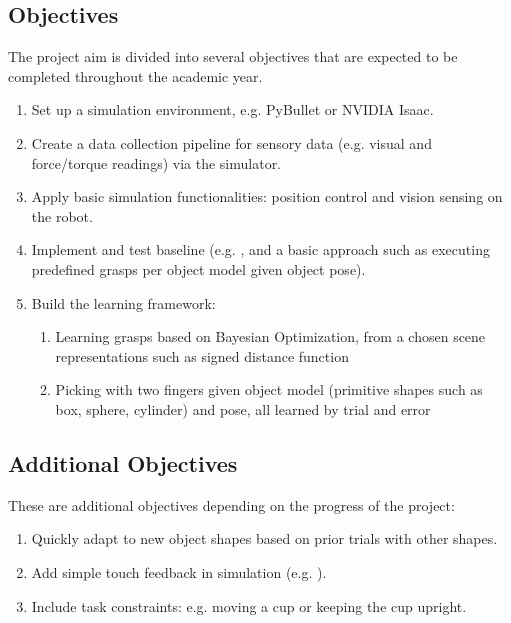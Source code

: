 \documentclass[12pt, a4paper]{report}
\theoremstyle{definition}
\begin{document}
\subsection{Objectives}
\label{sec:1.2.2}
The project aim is divided into several objectives that are expected to be completed throughout the academic year. 
\begin{enumerate}
    \item Set up a simulation environment, e.g. PyBullet or NVIDIA Isaac. 
    \item Create a data collection pipeline for sensory data (e.g. visual and force/torque readings) via the simulator.
    \item Apply basic simulation functionalities: position control and vision sensing on the robot.
    \item Implement and test baseline (e.g. \cite{breyer}, and a basic approach such as executing predefined grasps per object model given object pose).
    \item Build the learning framework:
    \begin{enumerate}
        \item Learning grasps based on Bayesian Optimization, from a chosen scene representations such as signed distance function 
        \item Picking with two fingers given object model (primitive shapes such as box, sphere, cylinder) and pose, all learned by trial and error
    \end{enumerate}
\end{enumerate}

\subsection{Additional Objectives}
These are additional objectives depending on the progress of the project:
\begin{enumerate}
    \item Quickly adapt to new object shapes based on prior trials with other shapes.
    \item Add simple touch feedback in simulation (e.g. \cite{bekiroglu}).
    \item Include task constraints: e.g. moving a cup or keeping the cup upright.
\end{enumerate}


\newpage
\end{document}
